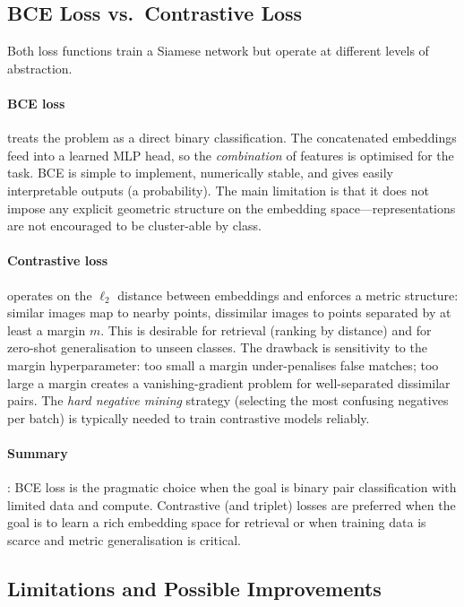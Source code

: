 \documentclass[11pt,letterpaper]{article}
\begin{document}
\subsection{BCE Loss vs.\ Contrastive Loss}

Both loss functions train a Siamese network but operate at different levels of abstraction.

\paragraph{BCE loss} treats the problem as a direct binary classification. The concatenated embeddings feed into a learned MLP head, so the \emph{combination} of features is optimised for the task. BCE is simple to implement, numerically stable, and gives easily interpretable outputs (a probability). The main limitation is that it does not impose any explicit geometric structure on the embedding space—representations are not encouraged to be cluster-able by class.

\paragraph{Contrastive loss} operates on the $\ell_2$ distance between embeddings and enforces a metric structure: similar images map to nearby points, dissimilar images to points separated by at least a margin $m$. This is desirable for retrieval (ranking by distance) and for zero-shot generalisation to unseen classes. The drawback is sensitivity to the margin hyperparameter: too small a margin under-penalises false matches; too large a margin creates a vanishing-gradient problem for well-separated dissimilar pairs. The \emph{hard negative mining} strategy (selecting the most confusing negatives per batch) is typically needed to train contrastive models reliably.

\paragraph{Summary}: BCE loss is the pragmatic choice when the goal is binary pair classification with limited data and compute. Contrastive (and triplet) losses are preferred when the goal is to learn a rich embedding space for retrieval or when training data is scarce and metric generalisation is critical.

\subsection{Limitations and Possible Improvements}
\end{document}
